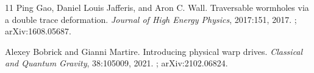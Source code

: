\documentclass[11pt]{article}
\begin{document}
\begin{thebibliography}{11}
Ping Gao, Daniel Louis Jafferis, and Aron C. Wall.
\newblock Traversable wormholes via a double trace deformation.
\newblock \emph{Journal of High Energy Physics}, 2017:151, 2017.
\newblock {}; arXiv:1608.05687.

Alexey Bobrick and Gianni Martire.
\newblock Introducing physical warp drives.
\newblock \emph{Classical and Quantum Gravity}, 38:105009, 2021.
\newblock {}; arXiv:2102.06824.

\end{thebibliography}
\end{document}
